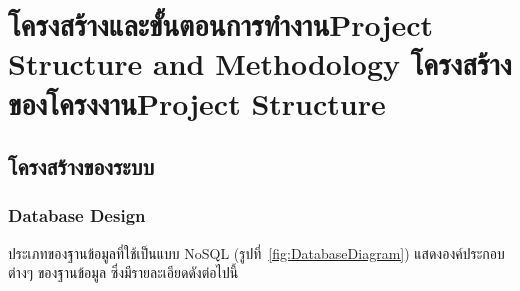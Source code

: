 \chapter{\ifproject%
\ifcpe โครงสร้างและขั้นตอนการทำงาน\else Project Structure and Methodology\fi
\else%
\ifcpe โครงสร้างของโครงงาน\else Project Structure\fi
\fi
}

\section{โครงสร้างของระบบ}



\subsection{Database Design}

ประเภทของฐานข้อมูลที่ใช้เป็นแบบ NoSQL
(รูปที่~\ref{fig:DatabaseDiagram}) แสดงองค์ประกอบต่างๆ ของฐานข้อมูล ซึ่งมีรายละเอียดดังต่อไปนี้
%
